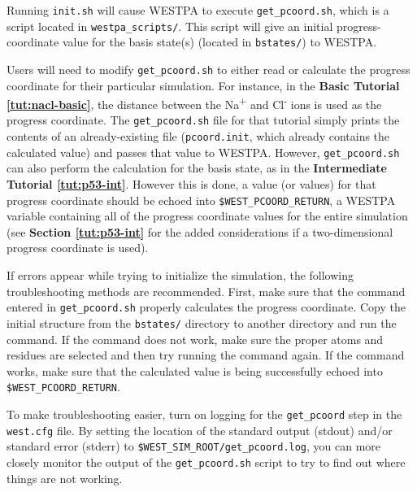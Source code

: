 Running \verb|init.sh| will cause WESTPA to execute \verb|get_pcoord.sh|, which is a script located in \verb|westpa_scripts/|. 
This script will give an initial progress-coordinate value for the basis state(s) (located in \verb|bstates/|) to WESTPA.


Users will need to modify \verb|get_pcoord.sh| to either read or calculate the progress coordinate for their particular simulation.
For instance, in the \textbf{Basic Tutorial \ref{tut:nacl-basic}}, the distance between the Na\textsuperscript{+} and Cl\textsuperscript{-} ions is used as the progress coordinate.
The \verb|get_pcoord.sh| file for that tutorial simply prints the contents of an already-existing file (\verb|pcoord.init|, which already contains the calculated value) and passes that value to WESTPA. 
However, \verb|get_pcoord.sh| can also perform the calculation for the basis state, as in the \textbf{Intermediate Tutorial \ref{tut:p53-int}}.
However this is done, a value (or values) for that progress coordinate should be echoed into \verb|$WEST_PCOORD_RETURN|, a WESTPA variable containing all of the progress coordinate values for the entire simulation (see \textbf{Section \ref{tut:p53-int}} for the added considerations if a two-dimensional progress coordinate is used).

If errors appear while trying to initialize the simulation, the following troubleshooting methods are recommended. 
First, make sure that the command entered in \verb|get_pcoord.sh| properly calculates the progress coordinate. 
Copy the initial structure from the \verb|bstates/| directory to another directory and run the command. 
If the command does not work, make sure the proper atoms and residues are selected and then try running the command again. 
If the command works, make sure that the calculated value is being successfully echoed into \verb|$WEST_PCOORD_RETURN|.

To make troubleshooting easier, turn on logging for the \verb|get_pcoord| step in the \verb|west.cfg| file. 
By setting the location of the standard output (stdout) and/or standard error (stderr) to \verb|$WEST_SIM_ROOT/get_pcoord.log|, you can more closely monitor the output of the \verb|get_pcoord.sh| script to try to find out where things are not working.

